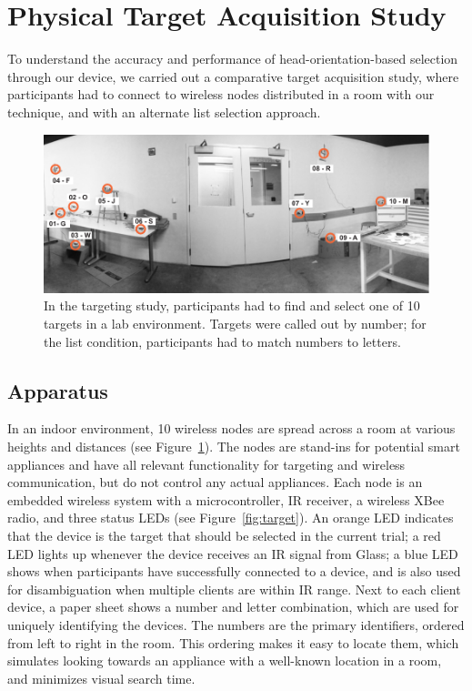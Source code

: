 \section{Physical Target Acquisition Study}
To understand the accuracy and performance of head-orientation-based  selection through our device, we carried out a comparative target acquisition study, where participants had to connect to wireless nodes distributed in a room with our technique, and with an alternate list selection approach.

\begin{figure}[t]
\centering
\includegraphics[width=1.0\columnwidth]{figures/targeting-study-layout.pdf}
\caption{In the targeting study, participants had to find and select one of 10 targets in a lab environment. Targets were called out by number; for the list condition, participants had to match numbers to letters.}
\label{fig:targeting-study-layout}
\end{figure}

\subsection{Apparatus}
In an indoor environment, 10 wireless nodes are spread across a room at various heights and distances (see Figure~\ref{fig:targeting-study-layout}). The nodes are stand-ins for potential smart appliances and have all relevant functionality for targeting and wireless communication, but do not control any actual appliances. Each node is an embedded wireless system with a microcontroller, IR receiver, a wireless XBee radio, and three status LEDs (see Figure~\ref{fig:target}). An orange LED indicates that the device is the target that should be selected in the current trial; a red LED lights up whenever the device receives an IR signal from Glass; a blue LED shows when participants have successfully connected to a device, and is also used for disambiguation when multiple clients are within IR range. Next to each client device, a paper sheet shows a number and letter combination, which are used for uniquely identifying the devices. The numbers are the primary identifiers, ordered from left to right in the room. This ordering makes it easy to locate them, which simulates looking towards an appliance with a well-known location in a room, and minimizes visual search time.



